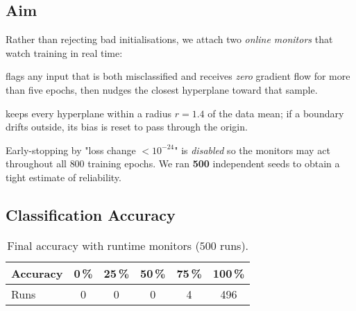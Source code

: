 
















\subsection*{Aim}
Rather than rejecting bad initialisations, we attach two \emph{online
monitors} that watch training in real time:

\begin{description}[leftmargin=2em,style=sameline]
  \item[DeadSampleMonitor] flags any input that is both misclassified
        and receives \emph{zero} gradient flow for more than five epochs,
        then nudges the closest hyperplane toward that sample.
  \item[BoundsMonitor] keeps every hyperplane within a radius
        $r = 1.4$ of the data mean; if a boundary drifts outside, its
        bias is reset to pass through the origin.
\end{description}

Early-stopping by "loss change $\!\!<\!10^{-24}$" is \emph{disabled}
so the monitors may act throughout all $800$ training epochs.
We ran \textbf{500} independent seeds to obtain a tight estimate of
reliability.

\subsection*{Classification Accuracy}

\begin{table}[ht]
\centering
\caption{Final accuracy with runtime monitors ($500$ runs).}
\label{tab:relu1-monitor-accuracy}
\begin{tabular}{lccccc}
\toprule
Accuracy & 0\,\% & 25\,\% & 50\,\% & 75\,\% & 100\,\% \\
\midrule
Runs & 0 & 0 & 0 & 4 & 496 \\
\bottomrule
\end{tabular}
\end{table}

